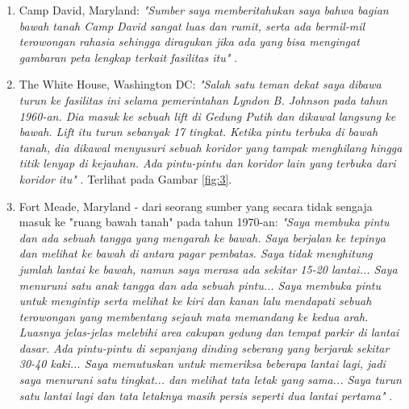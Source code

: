\documentclass[10pt,twocolumn,letterpaper]{article}
\begin{document}
\begin{flushleft}
\begin{enumerate}
    \item Camp David, Maryland: \textit{"Sumber saya memberitahukan saya bahwa bagian bawah tanah Camp David sangat luas dan rumit, serta ada bermil-mil terowongan rahasia sehingga diragukan jika ada yang bisa mengingat gambaran peta lengkap terkait fasilitas itu"} \cite{22}.
    \item The White House, Washington DC: \textit{"Salah satu teman dekat saya dibawa turun ke fasilitas ini selama pemerintahan Lyndon B. Johnson pada tahun 1960-an. Dia masuk ke sebuah lift di Gedung Putih dan dikawal langsung ke bawah. Lift itu turun sebanyak 17 tingkat. Ketika pintu terbuka di bawah tanah, dia dikawal menyusuri sebuah koridor yang tampak menghilang hingga titik lenyap di kejauhan. Ada pintu-pintu dan koridor lain yang terbuka dari koridor itu"} \cite{22}. Terlihat pada Gambar \ref{fig:3}.
    \item Fort Meade, Maryland - dari seorang sumber yang secara tidak sengaja masuk ke "ruang bawah tanah" pada tahun 1970-an: \textit{"Saya membuka pintu dan ada sebuah tangga yang mengarah ke bawah. Saya berjalan ke tepinya dan melihat ke bawah di antara pagar pembatas. Saya tidak menghitung jumlah lantai ke bawah, namun saya merasa ada sekitar 15-20 lantai... Saya menuruni satu anak tangga dan ada sebuah pintu... Saya membuka pintu untuk mengintip serta melihat ke kiri dan kanan lalu mendapati sebuah terowongan yang membentang sejauh mata memandang ke kedua arah. Luasnya jelas-jelas melebihi area cakupan gedung dan tempat parkir di lantai dasar. Ada pintu-pintu di sepanjang dinding seberang yang berjarak sekitar 30-40 kaki... Saya memutuskan untuk memeriksa beberapa lantai lagi, jadi saya menuruni satu tingkat... dan melihat tata letak yang sama... Saya turun satu lantai lagi dan tata letaknya masih persis seperti dua lantai pertama"} \cite{22}.
\end{enumerate}
\end{flushleft}
\end{document}
